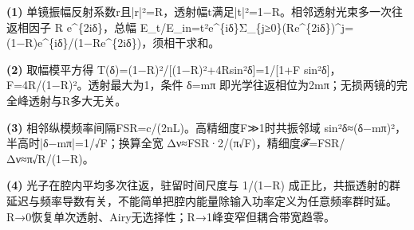 \par\noindent\textbf{(1)} 单镜振幅反射系数r且|r|²=R，透射幅t满足|t|²=1−R。相邻透射光束多一次往返相因子 R e\textasciicircum{}\{2iδ\}，总幅 E\_t/E\_in=t²e\textasciicircum{}\{iδ\}Σ\_\{j≥0\}(Re\textasciicircum{}\{2iδ\})\textasciicircum{}j=(1−R)e\textasciicircum{}\{iδ\}/(1−Re\textasciicircum{}\{2iδ\})，须相干求和。
\par\noindent\textbf{(2)} 取幅模平方得 T(δ)=(1−R)²/[(1−R)²+4Rsin²δ]=1/[1+F sin²δ]，F=4R/(1−R)²。透射最大为1，条件 δ=mπ 即光学往返相位为2mπ；无损两镜的完全峰透射与R多大无关。
\par\noindent\textbf{(3)} 相邻纵模频率间隔FSR=c/(2nL)。高精细度F≫1时共振邻域 sin²δ≈(δ−mπ)²，半高时|δ−mπ|=1/√F；换算全宽 Δν≈FSR·2/(π√F)，精细度𝓕=FSR/Δν≈π√R/(1−R)。
\par\noindent\textbf{(4)} 光子在腔内平均多次往返，驻留时间尺度与 1/(1−R) 成正比，共振透射的群延迟与频率导数有关，不能简单把腔内能量除输入功率定义为任意频率群时延。R→0恢复单次透射、Airy无选择性；R→1峰变窄但耦合带宽趋零。
